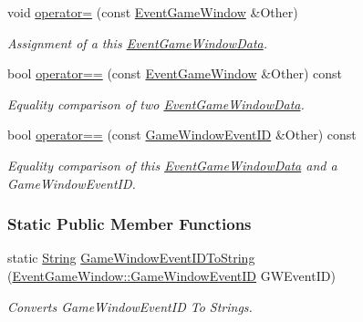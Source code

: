 \begin{DoxyCompactItemize}
void \hyperlink{classMezzanine_1_1EventGameWindow_a6935c29b1cf42798871e8a6e6600fa2e}{operator=} (const \hyperlink{classMezzanine_1_1EventGameWindow}{EventGameWindow} \&Other)
\begin{DoxyCompactList}\small\item\em Assignment of a this \hyperlink{classMezzanine_1_1EventGameWindowData}{EventGameWindowData}. \item\end{DoxyCompactList}\item 
bool \hyperlink{classMezzanine_1_1EventGameWindow_a10469157e4d442072a5751029a347056}{operator==} (const \hyperlink{classMezzanine_1_1EventGameWindow}{EventGameWindow} \&Other) const 
\begin{DoxyCompactList}\small\item\em Equality comparison of two \hyperlink{classMezzanine_1_1EventGameWindowData}{EventGameWindowData}. \item\end{DoxyCompactList}\item 
bool \hyperlink{classMezzanine_1_1EventGameWindow_aedf12ca51b11e074d8cb8baa801c19fa}{operator==} (const \hyperlink{classMezzanine_1_1EventGameWindow_a0f0ff29853317334f018bcf48d502af2}{GameWindowEventID} \&Other) const 
\begin{DoxyCompactList}\small\item\em Equality comparison of this \hyperlink{classMezzanine_1_1EventGameWindowData}{EventGameWindowData} and a GameWindowEventID. \item\end{DoxyCompactList}\end{DoxyCompactItemize}
\subsubsection*{Static Public Member Functions}
\begin{DoxyCompactItemize}
\item 
static \hyperlink{namespaceMezzanine_acf9fcc130e6ebf08e3d8491aebcf1c86}{String} \hyperlink{classMezzanine_1_1EventGameWindow_a0f4f76cc85926b7687187a1260427b60}{GameWindowEventIDToString} (\hyperlink{classMezzanine_1_1EventGameWindow_a0f0ff29853317334f018bcf48d502af2}{EventGameWindow::GameWindowEventID} GWEventID)
\begin{DoxyCompactList}\small\item\em Converts GameWindowEventID To Strings. \item\end{DoxyCompactList}\end{DoxyCompactItemize}

